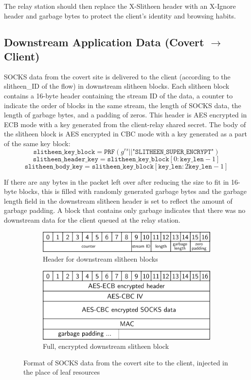 \documentclass[11pt]{article}
\theoremstyle{definittion}
\begin{document}
The relay station should then replace the X-Slitheen header with an X-Ignore header and garbage bytes to protect the client's identity and browsing habits.

\subsection{Downstream Application Data (Covert $\rightarrow$ Client)}

SOCKS data from the covert site is delivered to the client (according to the slitheen\_ID of the flow) in downstream slitheen blocks. Each slitheen block contains a 16-byte header containing the stream ID of the data, a counter to indicate the order of blocks in the same stream, the length of SOCKS data, the length of garbage bytes, and a padding of zeros. This header is AES encrypted in ECB mode with a key generated from the client-relay shared secret. The body of the slitheen block is AES encrypted in CBC mode with a key generated as a part of the same key block:
$$\texttt{slitheen\_key\_block} = \texttt{PRF}(g^{rs} || \texttt{"SLITHEEN\_SUPER\_ENCRYPT"})$$
$$\texttt{slitheen\_header\_key} = \texttt{slitheen\_key\_block}[0:\texttt{key\_len}-1] $$
$$\texttt{slitheen\_body\_key} = \texttt{slitheen\_key\_block}[\texttt{key\_len}:2\texttt{key\_len}-1] $$

If there are any bytes in the packet left over after reducing the size to fit in 16-byte blocks, this is filled with randomly generated garbage bytes and the garbage length field in the downstream slitheen header is set to reflect the amount of garbage padding.
A block that contains only garbage indicates that there was no downstream data for the client queued at the relay station.

\begin{figure}[h]
\begin{subfigure}{\textwidth}
\centering
\includegraphics[width=.75\textwidth]{downstream_slitheen_header}
\caption{Header for downstream slitheen blocks}
\end{subfigure}

\vspace{5mm}

\begin{subfigure}{\textwidth}
\centering
\includegraphics[width=.75\textwidth]{downstream_slitheen_block}
\caption{Full, encrypted downstream slitheen block}
\end{subfigure}
\caption{Format of SOCKS data from the covert site to the client, injected in the place of leaf resources}

\end{figure}
\end{document}
